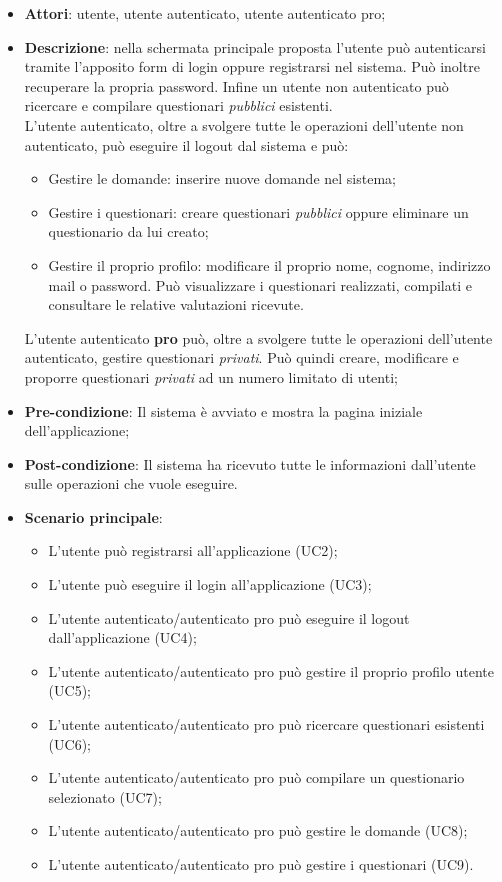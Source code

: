 \begin{itemize}
\item\textbf{Attori}: utente, utente autenticato, utente autenticato pro;
\item\textbf{Descrizione}: nella schermata principale proposta l'utente può autenticarsi tramite l'apposito form di login oppure registrarsi nel sistema. Può inoltre recuperare la propria password. Infine un utente non autenticato può ricercare e compilare questionari \textit{pubblici} esistenti.\\
L'utente autenticato, oltre a svolgere tutte le operazioni dell'utente non autenticato, può eseguire il logout dal sistema e può:
\begin{itemize}
\item Gestire le domande: inserire nuove domande nel sistema;
\item Gestire i questionari: creare questionari \textit{pubblici} oppure eliminare un questionario da lui creato;
\item Gestire il proprio profilo: modificare il proprio nome, cognome, indirizzo mail o password. Può visualizzare i questionari realizzati, compilati e consultare le relative valutazioni ricevute.
\end{itemize}
L'utente autenticato \textbf{pro} può, oltre a svolgere tutte le operazioni dell'utente autenticato, gestire questionari \textit{privati}. Può quindi creare, modificare e proporre questionari \textit{privati} ad un numero limitato di utenti;
\item\textbf{Pre-condizione}: Il sistema è avviato e mostra la pagina iniziale dell'applicazione;
\item\textbf{Post-condizione}: Il sistema ha ricevuto tutte le informazioni dall'utente sulle operazioni che vuole eseguire.
\item\textbf{Scenario principale}:
\begin{itemize}
\item L'utente può registrarsi all'applicazione (UC2);
\item L'utente può eseguire il login all'applicazione (UC3);
\item L'utente autenticato/autenticato pro può eseguire il logout dall'applicazione (UC4); 
\item L'utente autenticato/autenticato pro può gestire il proprio profilo utente (UC5);
\item L'utente autenticato/autenticato pro può ricercare questionari esistenti (UC6);
\item L'utente autenticato/autenticato pro può compilare un questionario  selezionato (UC7);
\item L'utente autenticato/autenticato pro può gestire le domande (UC8);
\item L'utente autenticato/autenticato pro può gestire i questionari (UC9).
\end{itemize}
\end{itemize}